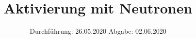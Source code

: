 

\subject{Versuch Nr. 702}
\title{Aktivierung mit Neutronen}
\date{%
  Durchführung: 26.05.2020
  \hspace{3em}
  Abgabe: 02.06.2020
}


\setlength{\parindent}{0pt} %

\maketitle
\thispagestyle{empty}
\tableofcontents
\newpage






%

\printbibliography{}


